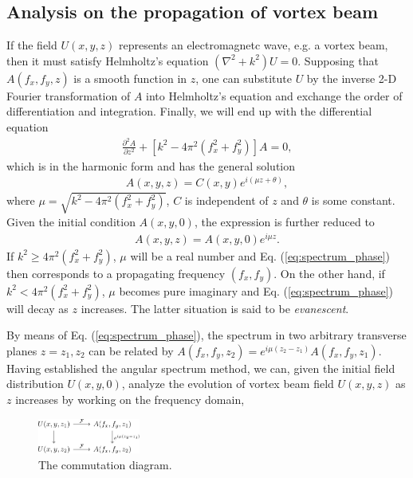 \subsection{Analysis on the propagation of vortex beam}
If the field $U(x, y, z)$ represents an electromagnetc wave, e.g. a vortex beam, then it must satisfy Helmholtz's equation $(\nabla^2 + k^2) U  = 0$. Supposing that $A(f_x, f_y, z)$ is a smooth function in $z$, one can substitute $U$ by the inverse 2-D Fourier transformation of $A$ into Helmholtz's equation and exchange the order of differentiation and integration. Finally, we will end up with the differential equation
\begin{eqnarray}
	\frac{\partial^2 A}{\partial z^2} + \left[ k^2 - 4\pi^2\left( f_x^2 + f_y^2 \right) \right] A= 0,
	\nonumber
\end{eqnarray}
which is in the harmonic form and has the general solution
\begin{eqnarray}
	A(x, y, z) = C(x, y) e^{i (\mu z + \theta)},
	\nonumber
\end{eqnarray}
where $\mu = \sqrt{k^2 - 4\pi^2\left( f_x^2 + f_y^2 \right)}$, $C$ is independent of $z$ and $\theta$ is some constant. Given the initial condition $A(x, y, 0)$, the expression is further reduced to
\begin{eqnarray}
	A(x, y, z) = A(x, y, 0) e^{i \mu z}.
	\label{eq:spectrum_phase}
\end{eqnarray}
If $k^2 \ge 4\pi^2 (f_x^2 + f_y^2)$, $\mu$ will be a real number and Eq. (\ref{eq:spectrum_phase}) then corresponds to a propagating frequency $(f_x, f_y)$. On the other hand, if $k^2 < 4\pi^2 (f_x^2 + f_y^2)$, $\mu$ becomes pure imaginary and Eq. (\ref{eq:spectrum_phase}) will decay as $z$ increases. The latter situation is said to be {\em evanescent}.

By means of Eq. (\ref{eq:spectrum_phase}), the spectrum in two arbitrary transverse planes $z = z_1, z_2$ can be related by $A(f_x, f_y, z_2) = e^{i \mu (z_2 - z_1)} A(f_x, f_y, z_1)$. Having established the angular spectrum method, we can, given the initial field distribution $U(x, y, 0)$, analyze the evolution of vortex beam field $U(x, y, z)$ as $z$ increases by working on the frequency domain,

\begin{figure}
	\centering
	\includegraphics[width = 0.3\textwidth]{cd.jpg}
	\caption{The commutation diagram.}
\end{figure}

